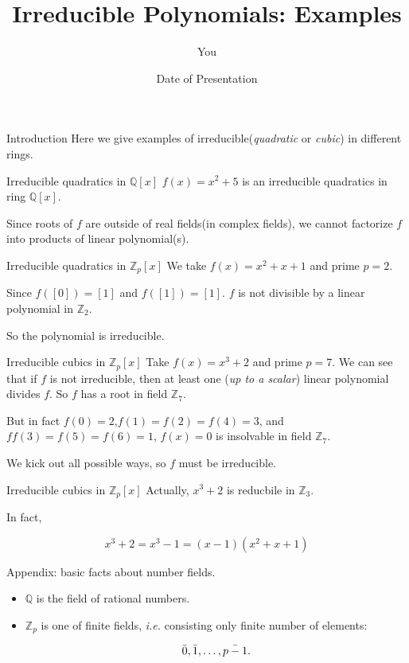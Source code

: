 \documentclass{beamer}
\title{Irreducible Polynomials: Examples}
\author{You}
\date{Date of Presentation}
\begin{document}
\begin{frame}
  \titlepage
\end{frame}

\begin{frame}{Introduction}
Here we give examples of irreducible(\textit{quadratic} or \textit{cubic}) in different rings.
\end{frame}


\begin{frame}{Irreducible quadratics in $\mathbb{Q}[x]$}
$f(x) = x^2+5$ is an irreducible quadratics in ring $\mathbb{Q}[x]$.

Since roots of $f$ are outside of real fields(in complex fields), we cannot factorize $f$ into products of linear polynomial(s).
\end{frame}


\begin{frame}{Irreducible quadratics in $\mathbb{Z}_p[x]$}
We take $f(x) = x^2+x+1$ and prime $p=2$.

Since $f([0])=[1]$ and $f([1])= [1]$.
$f$ is not divisible by a linear polynomial in $\mathbb{Z}_2$.

So the polynomial is irreducible.
\end{frame}


\begin{frame}{Irreducible cubics in $\mathbb{Z}_p[x]$}
Take $f(x)= x^3+2$ and prime $p=7$.
We can see that if $f$ is not irreducible, then at least one (\textit{up to a scalar}) linear polynomial divides $f$. So $f$ has a root in field $\mathbb{Z}_7$.

But in fact $f(0)=2$,$f(1)=f(2)=f(4)=3$, and $ff(3)=f(5)=f(6)=1$, $f(x)=0$ is insolvable in field $\mathbb{Z}_7$.

We kick out all possible ways, so $f$ must be irreducible.

\end{frame}



\begin{frame}{Irreducible cubics in $\mathbb{Z}_p[x]$}
Actually, $x^3+2$ is reducbile in $\mathbb{Z}_3$.

In fact,

$$
x^3+2 = x^3-1 = (x-1)(x^2+x+1)
$$
\end{frame}


\begin{frame}{Appendix: basic facts about number fields.}

\begin{itemize}
    \item $\mathbb{Q}$ is the field of rational numbers.
    
    \item $\mathbb{Z}_p$ is one of finite fields, \textit{i.e.} consisting only finite number of elements:
    
    $$
    \Bar{0},\Bar{1},\dots,\Bar{p-1}.
    $$
\end{itemize}

\end{frame}
\end{document}
